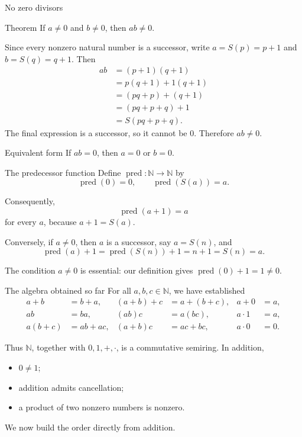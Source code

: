 \documentclass[aspectratio=169,11pt]{beamer}
\newcommand{\N}{\mathbb N}
\newcommand{\suc}[1]{S(#1)}
\begin{document}
\begin{frame}{No zero divisors}
  \small
  \begin{block}{Theorem}
    If \(a\ne0\) and \(b\ne0\), then \(ab\ne0\).
  \end{block}

  Since every nonzero natural number is a successor, write
  \(a=\suc p=p+1\) and \(b=\suc q=q+1\).  Then
  \begin{align*}
    ab
      &=(p+1)(q+1)\\
      &=p(q+1)+1(q+1)\\
      &=(pq+p)+(q+1)\\
      &=(pq+p+q)+1\\
      &=\suc{pq+p+q}.
  \end{align*}
  The final expression is a successor, so it cannot be \(0\).  Therefore
  \(ab\ne0\).

  \begin{alertblock}{Equivalent form}
    If \(ab=0\), then \(a=0\) or \(b=0\).
  \end{alertblock}
\end{frame}

\begin{frame}{The predecessor function}
  Define \(\operatorname{pred}\colon\N\to\N\) by
  \[
    \operatorname{pred}(0)=0,
    \qquad
    \operatorname{pred}(\suc a)=a.
  \]

  Consequently,
  \[
    \operatorname{pred}(a+1)=a
  \]
  for every \(a\), because \(a+1=\suc a\).

  Conversely, if \(a\ne0\), then \(a\) is a successor, say \(a=\suc n\), and
  \[
    \operatorname{pred}(a)+1
      =\operatorname{pred}(\suc n)+1
      =n+1
      =\suc n
      =a.
  \]

  The condition \(a\ne0\) is essential: our definition gives
  \(\operatorname{pred}(0)+1=1\ne0\).
\end{frame}

\begin{frame}{The algebra obtained so far}
  For all \(a,b,c\in\N\), we have established
  \begin{align*}
    a+b&=b+a, & (a+b)+c&=a+(b+c), & a+0&=a,\\
    ab&=ba, & (ab)c&=a(bc), & a\cdot1&=a,\\
    a(b+c)&=ab+ac, & (a+b)c&=ac+bc, & a\cdot0&=0.
  \end{align*}

  Thus \(\N\), together with \(0,1,+,\cdot\), is a
  \alert{commutative semiring}.  In addition,
  \begin{itemize}
    \item \(0\ne1\);
    \item addition admits cancellation;
    \item a product of two nonzero numbers is nonzero.
  \end{itemize}

  We now build the order directly from addition.
\end{frame}
\end{document}
